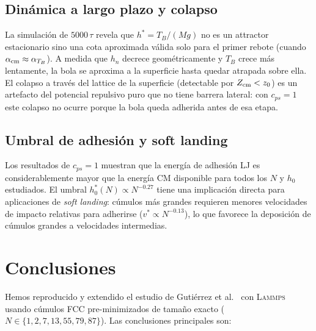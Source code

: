 \documentclass[12pt,a4paper]{article}
\newcommand{\lammps}{\textsc{Lammps}}
\begin{document}
\subsection{Dinámica a largo plazo y colapso}
\label{sec:largo_discusion}

La simulación de $5000\,\tau$ revela que $h^*=T_B/(Mg)$ no es un attractor
estacionario sino una cota aproximada válida solo para el primer rebote
(cuando $\alpha_{\rm cm}\approx\alpha_{T_B}$). A medida que $h_n$ decrece
geométricamente y $T_B$ crece más lentamente, la bola se aproxima a la
superficie hasta quedar atrapada sobre ella. El colapso a través del lattice
de la superficie (detectable por $Z_{\rm cm}<z_0$) es un artefacto del
potencial repulsivo puro que no tiene barrera lateral: con $c_{ps}=1$
este colapso no ocurre porque la bola queda adherida antes de esa etapa.

\subsection{Umbral de adhesión y soft landing}
\label{sec:adhesion_discusion}

Los resultados de $c_{ps}=1$ muestran que la energía de adhesión LJ es
considerablemente mayor que la energía CM disponible para todos los $N$
y $h_0$ estudiados. El umbral $h_0^*(N)\propto N^{-0.27}$ tiene una implicación
directa para aplicaciones de \emph{soft landing}: cúmulos más grandes requieren
menores velocidades de impacto relativas para adherirse ($v^*\propto N^{-0.13}$),
lo que favorece la deposición de cúmulos grandes a velocidades intermedias.

\section{Conclusiones}
\label{sec:conclusiones}

Hemos reproducido y extendido el estudio de Gutiérrez et al.~\cite{Gutierrez2012}
con \lammps{} usando cúmulos FCC pre-minimizados de tamaño exacto
($N\in\{1,2,7,13,55,79,87\}$). Las conclusiones principales son:
\end{document}
